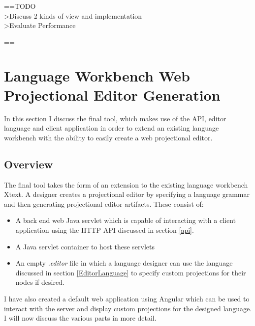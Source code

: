 \documentclass{report}
\begin{document}
==TODO 
\\>Discuss 2 kinds of view and implementation
\\>Evaluate Performance



==




\section{Language Workbench Web Projectional Editor Generation}
In this section I discuss the final tool, which makes use of the API, editor language and client application in order to extend an existing language workbench with the ability to easily create a web projectional editor.
\subsection{Overview}
The final tool takes the form of an extension to the existing language workbench Xtext. A designer creates a projectional editor by specifying a language grammar and then generating projectional editor artifacts. These consist of:
\begin{itemize}
\item A back end web Java servlet which is capable of interacting with a client application using the HTTP API discussed in section \ref{api}.
\item A Java servlet container to host these servlets
\item An empty \emph{.editor} file in which a language designer can use the language discussed in section \ref{EditorLanguage} to specify custom projections for their nodes if desired.  
\end{itemize}
I have also created a default web application using Angular which can be used to interact with the server and display custom projections for the designed language. I will now discuss the various parts in more detail.
\end{document}
